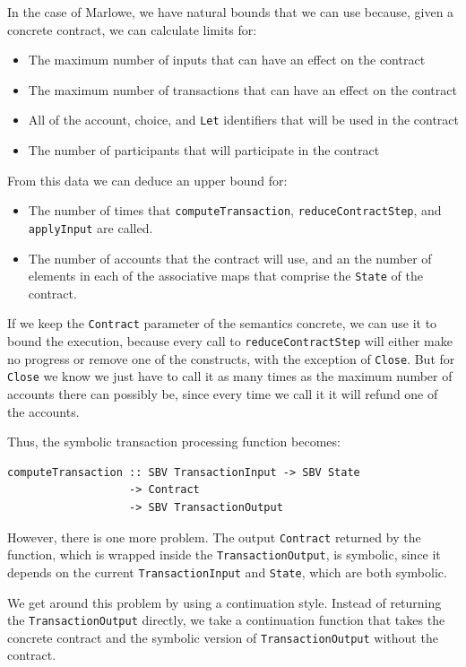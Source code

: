 \documentclass[english,runningheads]{llncs}
\begin{document}
In the case of Marlowe, we have natural bounds that we can use because,
given a concrete contract, we can calculate limits for:
\begin{itemize}
\item The maximum number of inputs that can have an effect on the contract
\item The maximum number of transactions that can have an effect on the
contract
\item All of the account, choice, and \texttt{Let} identifiers that will
be used in the contract
\item The number of participants that will participate in the contract
\end{itemize}
From this data we can deduce an upper bound for:
\begin{itemize}
\item The number of times that
\texttt{computeTransaction}, \texttt{reduceContractStep}, and \texttt{applyInput} are
called.
\item The number of accounts that the contract will use, and an
the number of elements in each of the associative maps
that comprise the \texttt{State} of the contract.
\end{itemize}
If we keep the \texttt{Contract} parameter of the semantics concrete,
we can use it to bound the execution, because every call to \texttt{reduceContractStep}
will either make no progress or remove one of the constructs, with
the exception of \texttt{Close}. But for \texttt{Close} we know we
just have to call it as many times as the maximum number of accounts
there can possibly be, since every time we call it it will refund
one of the accounts.

Thus, the symbolic transaction processing function becomes:

\begin{verbatim}
computeTransaction :: SBV TransactionInput -> SBV State
                   -> Contract
                   -> SBV TransactionOutput
\end{verbatim}

However, there is one more problem. The output \texttt{Contract} returned
by the function, which is wrapped inside the \texttt{TransactionOutput},
is symbolic, since it depends on the current \texttt{TransactionInput}
and \texttt{State}, which are both symbolic.

We get around this problem by using a continuation style. Instead
of returning the \texttt{TransactionOutput} directly, we take a continuation
function that takes the concrete contract and the symbolic version
of \texttt{TransactionOutput} without the contract.
\end{document}

